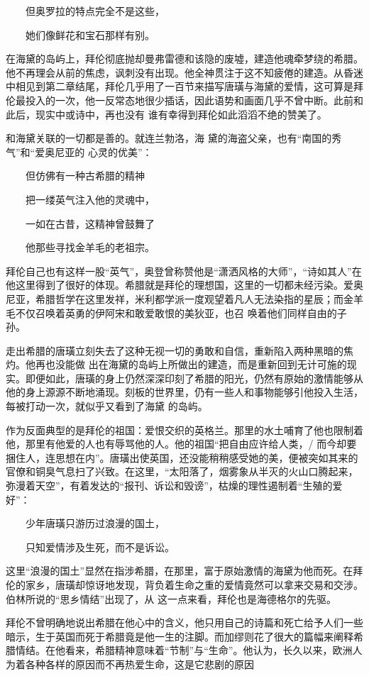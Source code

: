 \documentclass{article}
\begin{document}
　　但奥罗拉的特点完全不是这些， 


　　她们像鲜花和宝石那样有别。 

在海黛的岛屿上，拜伦彻底抛却曼弗雷德和该隐的废墟，建造他魂牵梦绕的希腊。他不再理会从前的焦虑，讽刺没有出现。他全神贯注于这不知疲倦的建造。从昏迷中相见到第二章结尾，拜伦几乎用了一百节来描写唐璜与海黛的爱情，这可算是拜伦最投入的一次，他一反常态地很少插话，因此语势和画面几乎不曾中断。此前和此后，现实中或诗中，再也没有
谁有幸得到拜伦如此滔滔不绝的赞美了。 

和海黛关联的一切都是善的。就连兰勃洛，海
\newpage
黛的海盗父亲，也有“南国的秀气”和“爱奥尼亚的
心灵的优美”： 


　　但仿佛有一种古希腊的精神 


　　把一缕英气注入他的灵魂中， 


　　一如在古昔，这精神曾鼓舞了 


　　他那些寻找金羊毛的老祖宗。 

拜伦自己也有这样一股“英气”，奥登曾称赞他是“潇洒风格的大师”，“诗如其人”在他这里得到了很好的体现。希腊就是拜伦的理想国，这里的一切都未经污染。爱奥尼亚，希腊哲学在这里发祥，米利都学派一度观望着凡人无法染指的星辰；而金羊毛不仅召唤着英勇的伊阿宋和敢爱敢恨的美狄亚，也召
唤着他们同样自由的子孙。 

走出希腊的唐璜立刻失去了这种无视一切的勇敢和自信，重新陷入两种黑暗的焦灼。他再也没能做
\newpage
出在海黛的岛屿上所做出的建造，而是重新回到无计可施的现实。即便如此，唐璜的身上仍然深深印刻了希腊的阳光，仍然有原始的激情能够从他的身上源源不断地涌现。刻板的世界里，仍有一些人和事物能够引他投入生活，每被打动一次，就似乎又看到了海黛
的岛屿。 

作为反面典型的是拜伦的祖国：爱恨交织的英格兰。那里的水土哺育了他也限制着他，那里有他爱的人也有辱骂他的人。他的祖国“把自由应许给人类，/ 而今却要捆住人，连思想在内”。唐璜出使英国，还没能稍稍感受她的美，便被突如其来的官僚和铜臭气息扫了兴致。在这里，“太阳落了，烟雾象从半灭的火山口腾起来，弥漫着天空”，有着发达的“报刊、诉讼和毁谤”，枯燥的理性遏制着“生殖的爱
好”： 


　　少年唐璜只游历过浪漫的国土， 


　　只知爱情涉及生死，而不是诉讼。 

\newpage

这里“浪漫的国土”显然在指涉希腊，在那里，富于原始激情的海黛为他而死。在拜伦的家乡，唐璜却惊讶地发现，背负着生命之重的爱情竟然可以拿来交易和交涉。伯林所说的“思乡情结”出现了，从
这一点来看，拜伦也是海德格尔的先驱。 

拜伦不曾明确地说出希腊在他心中的含义，他只用自己的诗篇和死亡给予人们一些暗示，生于英国而死于希腊竟是他一生的注脚。而加缪则花了很大的篇幅来阐释希腊情结。在他看来，希腊精神意味着“节制”与“生命”。他认为，长久以来，欧洲人为着各种各样的原因而不再热爱生命，这是它悲剧的原因
\end{document}
